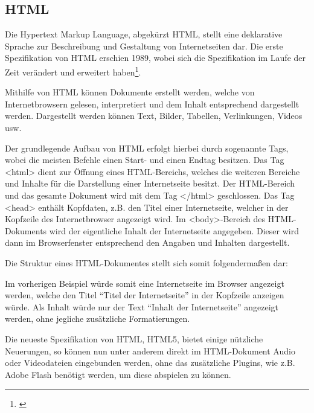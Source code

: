\subsection{HTML}
\label{sec:Html}

Die Hypertext Markup Language, abgekürzt HTML, stellt eine deklarative Sprache zur Beschreibung und Gestaltung von Internetseiten dar. Die erste Spezifikation von HTML erschien 1989, wobei sich die Spezifikation im Laufe der Zeit verändert und erweitert haben\footnote{\citet{taglinger2003}}.

Mithilfe von HTML können Dokumente erstellt werden, welche von Internetbrowsern gelesen, interpretiert und dem Inhalt entsprechend dargestellt werden. Dargestellt werden können Text, Bilder, Tabellen, Verlinkungen, Videos usw.

Der grundlegende Aufbau von HTML erfolgt hierbei durch sogenannte Tags, wobei die meisten Befehle einen Start- und einen Endtag besitzen.
Das Tag <html> dient zur Öffnung eines HTML-Bereichs, welches die weiteren Bereiche und Inhalte für die Darstellung einer Internetseite besitzt. Der HTML-Bereich und das gesamte Dokument wird mit dem Tag </html> geschlossen. Das Tag <head> enthält Kopfdaten, z.B. den Titel einer Internetseite, welcher in der Kopfzeile des Internetbrowser angezeigt wird. Im <body>-Bereich des HTML-Dokuments wird der eigentliche Inhalt der Internetseite angegeben. Dieser wird dann im Browserfenster entsprechend den Angaben und Inhalten dargestellt.

Die Struktur eines HTML-Dokumentes stellt sich somit folgendermaßen dar:



Im vorherigen Beispiel würde somit eine Internetseite im Browser angezeigt werden, welche den Titel "`Titel der Internetseite"' in der Kopfzeile anzeigen würde. Als Inhalt würde nur der Text "`Inhalt der Internetseite"' angezeigt werden, ohne jegliche zusätzliche Formatierungen.

Die neueste Spezifikation von HTML, HTML5, bietet einige nützliche Neuerungen, so können nun unter anderem direkt im HTML-Dokument Audio oder Videodateien eingebunden werden, ohne das zusätzliche Plugins, wie z.B. Adobe Flash benötigt werden, um diese abspielen zu können.